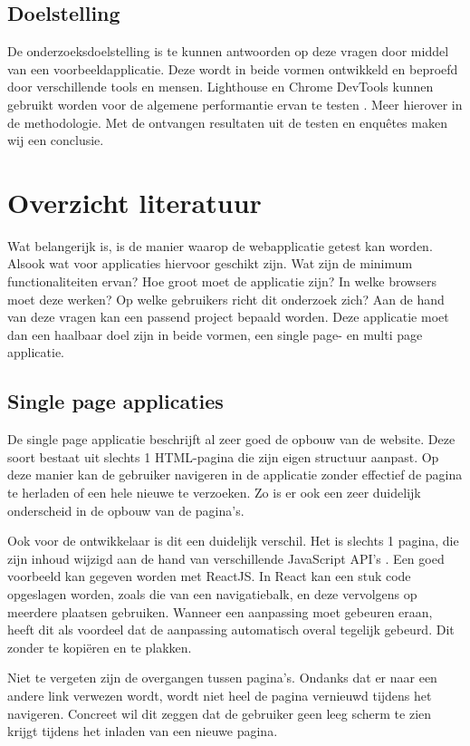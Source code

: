 \documentclass{hogent-article}
\begin{document}
\subsection{Doelstelling}
De onderzoeksdoelstelling is te kunnen antwoorden op deze vragen door middel van een voorbeeldapplicatie.
Deze wordt in beide vormen ontwikkeld en beproefd door verschillende tools en mensen.
Lighthouse en Chrome DevTools kunnen gebruikt worden voor de algemene performantie ervan te testen \autocite{Demian2022}.
Meer hierover in de methodologie.
Met de ontvangen resultaten uit de testen en enquêtes maken wij een conclusie.


\section{Overzicht literatuur}
Wat belangerijk is, is de manier waarop de webapplicatie getest kan worden.
Alsook wat voor applicaties hiervoor geschikt zijn.
Wat zijn de minimum functionaliteiten ervan?
Hoe groot moet de applicatie zijn?
In welke browsers moet deze werken?
Op welke gebruikers richt dit onderzoek zich?
Aan de hand van deze vragen kan een passend project bepaald worden.
Deze applicatie moet dan een haalbaar doel zijn in beide vormen, een single page- en multi page applicatie.

\subsection{Single page applicaties}
De single page applicatie beschrijft al zeer goed de opbouw van de website.
Deze soort bestaat uit slechts 1 HTML-pagina die zijn eigen structuur aanpast.
Op deze manier kan de gebruiker navigeren in de applicatie zonder effectief de pagina te herladen of een hele nieuwe te verzoeken.
Zo is er ook een zeer duidelijk onderscheid in de opbouw van de pagina's.

Ook voor de ontwikkelaar is dit een duidelijk verschil.
Het is slechts 1 pagina, die zijn inhoud wijzigd aan de hand van verschillende JavaScript API's \autocite{MDN2022}.
Een goed voorbeeld kan gegeven worden met ReactJS.
In React kan een stuk code opgeslagen worden, zoals die van een navigatiebalk, en deze vervolgens op meerdere plaatsen gebruiken.
Wanneer een aanpassing moet gebeuren eraan, heeft dit als voordeel dat de aanpassing automatisch overal tegelijk gebeurd.
Dit zonder te kopiëren en te plakken.

Niet te vergeten zijn de overgangen tussen pagina's.
Ondanks dat er naar een andere link verwezen wordt, wordt niet heel de pagina vernieuwd tijdens het navigeren.
Concreet wil dit zeggen dat de gebruiker geen leeg scherm te zien krijgt tijdens het inladen van een nieuwe pagina.
\end{document}
